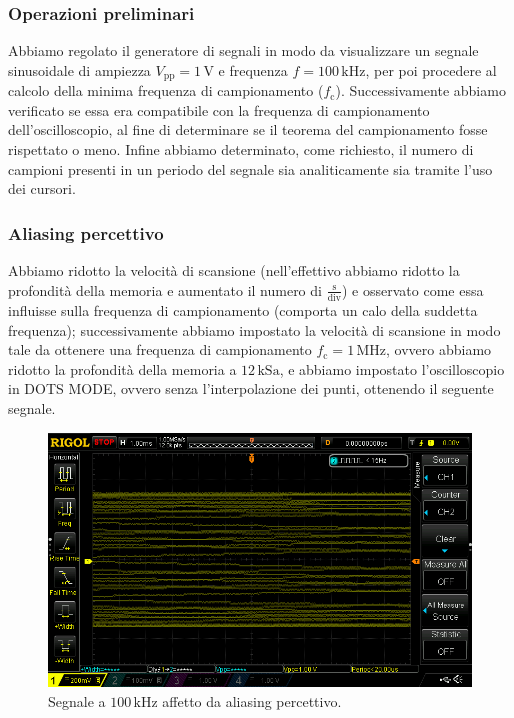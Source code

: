 \documentclass[a4paper]{article}
\begin{document}
			\subsubsection{Operazioni preliminari}
				Abbiamo regolato il generatore di segnali in modo da visualizzare un segnale sinusoidale di ampiezza $ V_{\mathrm{pp}} = 1 \, \mathrm{V} $ e frequenza $ f = 100 \, \mathrm{kHz} $, per poi procedere al calcolo della minima frequenza di campionamento ($ f_{\mathrm{c}} $). Successivamente abbiamo verificato se essa era compatibile con la frequenza di campionamento dell'oscilloscopio, al fine di determinare se il teorema del campionamento fosse rispettato o meno. Infine abbiamo determinato, come richiesto, il numero di campioni presenti in un periodo del segnale sia analiticamente sia tramite l'uso dei cursori.
			\subsubsection{Aliasing percettivo}
				Abbiamo ridotto la velocità di scansione (nell'effettivo abbiamo ridotto la profondità della memoria e aumentato il numero di $ \mathrm{\frac{s}{div}} $) e osservato come essa influisse sulla frequenza di campionamento (comporta un calo della suddetta frequenza); successivamente abbiamo impostato la velocità di scansione in modo tale da ottenere una frequenza di campionamento $ f_{\mathrm{c}} = 1 \, \mathrm{MHz} $, ovvero abbiamo ridotto la profondità della memoria a $ 12 \, \mathrm{kSa} $, e abbiamo impostato l'oscilloscopio in DOTS MODE, ovvero senza l'interpolazione dei punti, ottenendo il seguente segnale.
				\newline
				\begin{figure}[h!]
					\centering
					\includegraphics[scale=0.4]{aliasingPercettivo1MHz}
					\caption{Segnale a $ 100 \, \mathrm{kHz} $ affetto da aliasing percettivo.}
					\label{fig:aliasingPercettivo1MHz}
				\end{figure}
\end{document}
